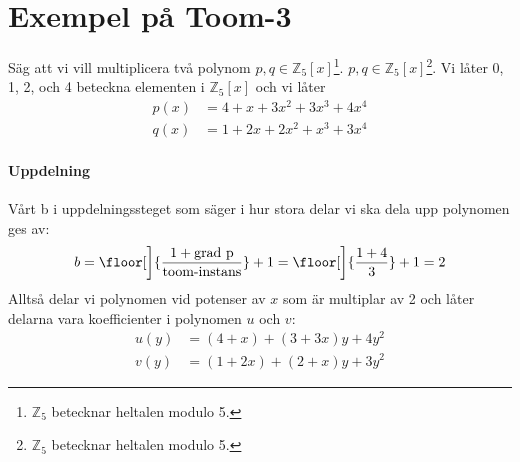 \section{Exempel på Toom-3}
Säg att vi vill multiplicera två polynom $p, q \in \mathbb{Z}_5[x]$\footnote{$\mathbb{Z}_5$ betecknar heltalen modulo 5.}.
$p, q \in \mathbb{Z}_5[x]$\footnote{$\mathbb{Z}_5$ betecknar heltalen modulo 5.}.
Vi låter 0, 1, 2, och 4 beteckna elementen i $\mathbb{Z}_5[x]$ och vi låter
\begin{align*}
  p(x) &= 4+x+3x^2+3x^3+4x^4 \\
  q(x) &= 1+2x+2x^2+x^3+3x^4
\end{align*}

\paragraph{Uppdelning}
Vårt b i uppdelningssteget som säger i hur stora delar vi ska dela upp
polynomen ges av:
\begin{equation*}
  b = \floor[\bigg]{\frac{1 + \mbox{grad p}}{\mbox{toom-instans}}} + 1 = \floor[\bigg]{\frac{1 + 4}{3}} + 1 = 2
\end{equation*}
Alltså delar vi polynomen vid potenser av $x$ som är multiplar av 2 och låter
delarna vara koefficienter i polynomen $u$ och $v$:
\begin{align*}
  u(y) &= (4+x)+(3 + 3x)y+ 4y^2 \\
  v(y) &= (1 + 2x)+ (2 + x)y + 3y^2
\end{align*}

